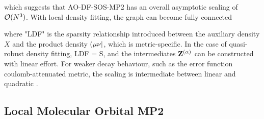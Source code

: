\noindent which suggests that AO-DF-SOS-MP2 has an overall asymptotic scaling of $\mathcal{O}(N^{3})$. With local density fitting, the graph can become fully connected
\begin{center}
\end{center}

\noindent where "LDF" is the sparsity relationship introduced between the auxiliary density $X$ and the product density $\left( \mu\nu \right\rvert$, which is metric-specific. In the case of quasi-robust density fitting, LDF = S, and the intermediates $\mathbf{Z}^{(\alpha)}$ can be constructed with linear effort. For weaker decay behaviour, such as the error function coulomb-attenuated metric, the scaling is intermediate between linear and quadratic \cite{Gla2020}. 




\subsection{Local Molecular Orbital MP2}

